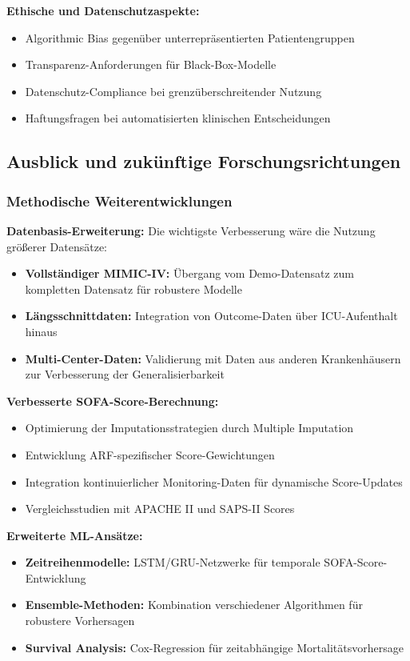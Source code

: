 \documentclass[12pt]{article}
\begin{document}
\textbf{Ethische und Datenschutzaspekte:}
\begin{itemize}
    \item Algorithmic Bias gegenüber unterrepräsentierten Patientengruppen
    \item Transparenz-Anforderungen für Black-Box-Modelle
    \item Datenschutz-Compliance bei grenzüberschreitender Nutzung
    \item Haftungsfragen bei automatisierten klinischen Entscheidungen
\end{itemize}

\subsection{Ausblick und zukünftige Forschungsrichtungen}

\subsubsection{Methodische Weiterentwicklungen}

\textbf{Datenbasis-Erweiterung:}
Die wichtigste Verbesserung wäre die Nutzung größerer Datensätze:
\begin{itemize}
    \item \textbf{Vollständiger MIMIC-IV:} Übergang vom Demo-Datensatz zum kompletten Datensatz für robustere Modelle
    \item \textbf{Längsschnittdaten:} Integration von Outcome-Daten über ICU-Aufenthalt hinaus
    \item \textbf{Multi-Center-Daten:} Validierung mit Daten aus anderen Krankenhäusern zur Verbesserung der Generalisierbarkeit
\end{itemize}

\textbf{Verbesserte SOFA-Score-Berechnung:}
\begin{itemize}
    \item Optimierung der Imputationsstrategien durch Multiple Imputation
    \item Entwicklung ARF-spezifischer Score-Gewichtungen
    \item Integration kontinuierlicher Monitoring-Daten für dynamische Score-Updates
    \item Vergleichsstudien mit APACHE II und SAPS-II Scores
\end{itemize}

\textbf{Erweiterte ML-Ansätze:}
\begin{itemize}
    \item \textbf{Zeitreihenmodelle:} LSTM/GRU-Netzwerke für temporale SOFA-Score-Entwicklung
    \item \textbf{Ensemble-Methoden:} Kombination verschiedener Algorithmen für robustere Vorhersagen
    \item \textbf{Survival Analysis:} Cox-Regression für zeitabhängige Mortalitätsvorhersage
\end{itemize}
\end{document}
